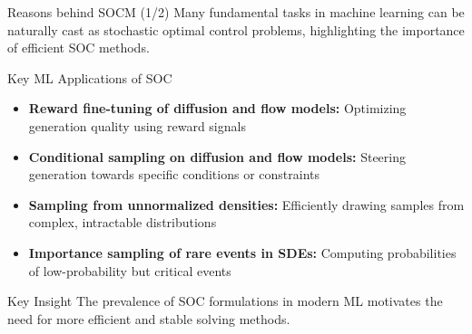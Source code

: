 \documentclass[aspectratio=169,xcolor=dvipsnames]{beamer}
\begin{document}
\begin{frame}{Reasons behind SOCM (1/2)}
    Many fundamental tasks in machine learning can be naturally cast as stochastic optimal control problems, highlighting the importance of efficient SOC methods.
    
    \vspace{0.4cm}
    
    \begin{block}{Key ML Applications of SOC}
        \begin{itemize}
            \item \textbf{Reward fine-tuning of diffusion and flow models:} Optimizing generation quality using reward signals
            
            \vspace{0.2cm}
            
            \item \textbf{Conditional sampling on diffusion and flow models:} Steering generation towards specific conditions or constraints
            
            \vspace{0.2cm}
            
            \item \textbf{Sampling from unnormalized densities:} Efficiently drawing samples from complex, intractable distributions
            
            \vspace{0.2cm}
            
            \item \textbf{Importance sampling of rare events in SDEs:} Computing probabilities of low-probability but critical events
        \end{itemize}
    \end{block}
    
    \vspace{0.3cm}
    
    \begin{alertblock}{Key Insight}
        The prevalence of SOC formulations in modern ML motivates the need for more efficient and stable solving methods.
    \end{alertblock}
\end{frame}
\end{document}
